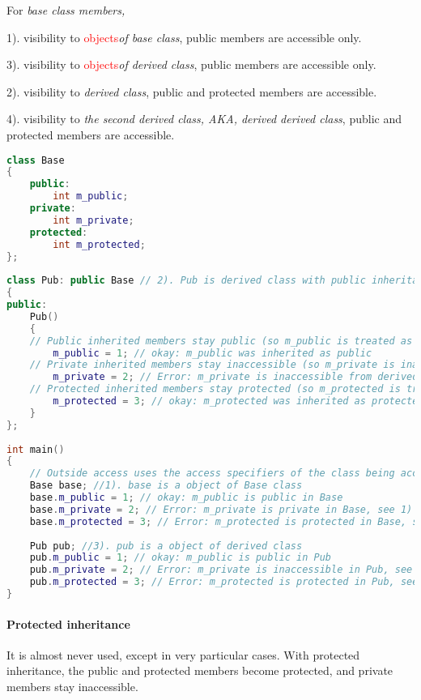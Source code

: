 \documentclass{book}
\begin{document}
For \textit{base class members,} 

1). visibility to \textcolor{red}{objects}\textit{of base class}, public members are accessible only.

3). visibility to \textcolor{red}{objects}\textit{of derived class}, public members are accessible only.

2). visibility to \textit{derived class}, public and protected members are accessible.

4). visibility to \textit{the second derived class, AKA, derived derived class}, public and protected members are accessible.
\begin{lstlisting}[caption={Public inheritance exmaple }, language=C++]
class Base
{
    public:
        int m_public;
    private:
        int m_private;
    protected:
        int m_protected;
};
 
class Pub: public Base // 2). Pub is derived class with public inheritance
{
public:
    Pub()
    {
    // Public inherited members stay public (so m_public is treated as public)
        m_public = 1; // okay: m_public was inherited as public
    // Private inherited members stay inaccessible (so m_private is inaccessible)
        m_private = 2; // Error: m_private is inaccessible from derived class
    // Protected inherited members stay protected (so m_protected is treated as protected)
        m_protected = 3; // okay: m_protected was inherited as protected
    }
};
 
int main()
{
    // Outside access uses the access specifiers of the class being accessed.
    Base base; //1). base is a object of Base class
    base.m_public = 1; // okay: m_public is public in Base
    base.m_private = 2; // Error: m_private is private in Base, see 1)
    base.m_protected = 3; // Error: m_protected is protected in Base, see 1)
 
    Pub pub; //3). pub is a object of derived class
    pub.m_public = 1; // okay: m_public is public in Pub
    pub.m_private = 2; // Error: m_private is inaccessible in Pub, see 3)
    pub.m_protected = 3; // Error: m_protected is protected in Pub, see 3)
}
\end{lstlisting}

\paragraph{Protected inheritance}
It is almost never used, except in very particular cases. With protected inheritance, the public and protected members become protected, and private members stay inaccessible.
\end{document}
